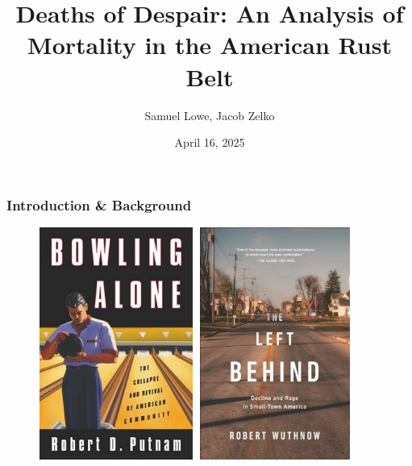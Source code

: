 \documentclass{beamer}
\title{Deaths of Despair: An Analysis of Mortality in the American Rust Belt}
\author{Samuel Lowe, Jacob Zelko}
\institute{Northeastern University}
\date{April 16, 2025}
\begin{document}
\frame{\titlepage}

\begin{frame}
    \frametitle{Introduction \& Background}

    \begin{figure}[!htb]
            \includegraphics[height=3in, width=2in]{Bowling_Alone.jpg}
        \endminipage\hfill
            \includegraphics[height=3in, width=2in]{The Left Behind.png}
        \endminipage
    \end{figure}

\end{frame}
\end{document}

